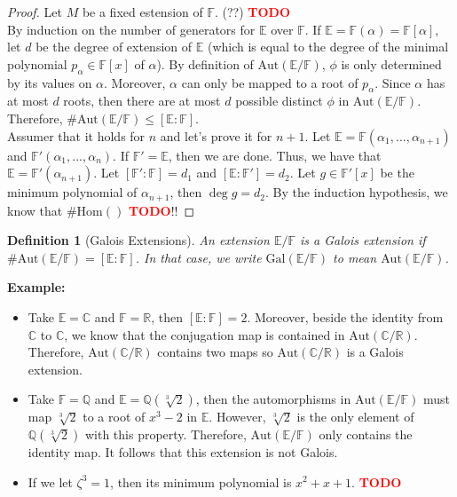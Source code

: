 \documentclass{article}
\newtheorem*{definition}{Definition}
\newcommand{\C}{\mathbb{C}}
\newcommand{\R}{\mathbb{R}}
\newcommand{\Q}{\mathbb{Q}}
\newcommand{\F}{\mathbb{F}}
\newcommand{\E}{\mathbb{E}}
\newcommand{\Aut}{\text{Aut}}
\newcommand{\Hom}{\text{Hom}}
\newcommand{\Gal}{\text{Gal}}
\newcommand{\td}{\textcolor{red}{\textbf{TODO}}}
\newenvironment{example}{\noindent\textbf{Example:} \vspace{-0.2cm}\begin{itemize}}{\end{itemize}}
\begin{document}
\begin{proof}
    Let $M$ be a fixed estension of $\F$. (??) \td \\
    By induction on the number of generators for $\E$ over $\F$. If $\E = \F(\alpha) = \F[\alpha]$, let $d$ be the degree of extension of $\E$ (which is equal to the degree of the minimal polynomial $p_{\alpha} \in \F[x]$ of $\alpha$). By definition of $\Aut (\E / \F)$, $\phi$ is only determined by its values on $\alpha$. Moreover, $\alpha$ can only be mapped to a root of $p_{\alpha}$. Since $\alpha$ has at most $d$ roots, then there are at most $d$ possible distinct $\phi$ in $\Aut (\E / \F)$. Therefore, $\# \Aut(\E / \F) \leq [\E : \F]$.\\
    Assumer that it holds for $n$ and let's prove it for $n+1$. Let $\E = \F(\alpha_1, ..., \alpha_{n+1})$ and $\F'(\alpha_1, ..., \alpha_n)$. If $\F' = \E$, then we are done. Thus, we have that $\E = \F'(\alpha_{n+1})$. Let $[\F' : \F] = d_1$ and $[\E : \F'] = d_2$. Let $g \in \F'[x]$ be the minimum polynomial of $\alpha_{n+1}$, then $\deg g = d_2$. By the induction hypothesis, we know that $\#\Hom()$ \td !!
\end{proof}

\begin{definition}[Galois Extensions]
    An extension $\E / \F$ is a Galois extension if $\# \Aut(\E / \F) = [\E : \F]$. In that case, we write $\Gal(\E / \F)$ to mean $\Aut(\E / \F)$.
\end{definition}

\begin{example}
    \item Take $\E = \C$ and $\F = \R$, then $[\E : \F] = 2$. Moreover, beside the identity from $\C$ to $\C$, we know that the conjugation map is contained in $\Aut(\C / \R)$. Therefore, $\Aut(\C / \R)$ contains two maps so $\Aut(\C / \R)$ is a Galois extension. 
    \item Take $\F = \Q$ and $\E = \Q(\sqrt[3]{2})$, then the automorphisms in $\Aut(\E / \F)$ must map $\sqrt[3]{2}$ to a root of $x^3 - 2$ in $\E$. However, $\sqrt[3]{2}$ is the only element of $\Q(\sqrt[3]{2})$ with this property. Therefore, $\Aut(\E / \F)$ only contains the identity map. It follows that this extension is not Galois.
    \item If we let $\zeta^3 = 1$, then its minimum polynomial is $x^2 + x + 1$. \td 
\end{example}
\end{document}
